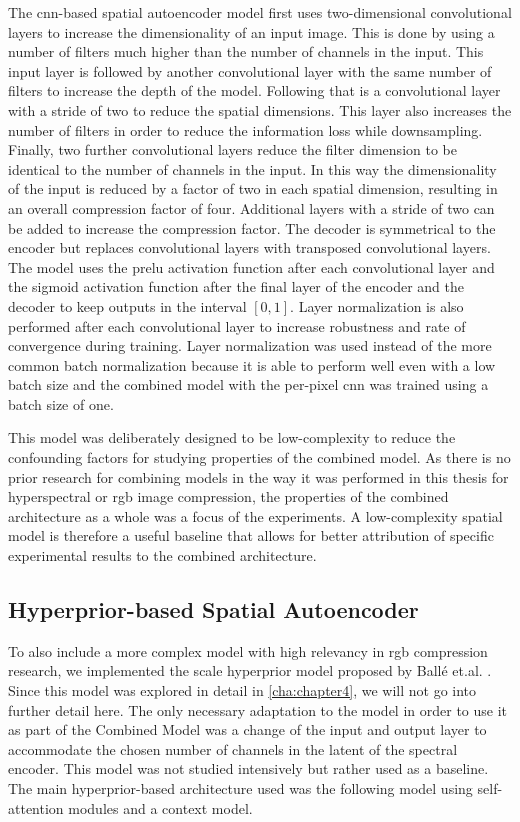 The \ac{cnn}-based spatial autoencoder model first uses two-dimensional convolutional layers to increase the dimensionality of an input image. This is done by using a number of filters much higher than the number of channels in the input. This input layer is followed by another convolutional layer with the same number of filters to increase the depth of the model. Following that is a convolutional layer with a stride of two to reduce the spatial dimensions. This layer also increases the number of filters in order to reduce the information loss while downsampling. Finally, two further convolutional layers reduce the filter dimension to be identical to the number of channels in the input. In this way the dimensionality of the input is reduced by a factor of two in each spatial dimension, resulting in an overall compression factor of four. Additional layers with a stride of two can be added to increase the compression factor. The decoder is symmetrical to the encoder but replaces convolutional layers with transposed convolutional layers. The model uses the \ac{prelu} activation function after each convolutional layer and the sigmoid activation function after the final layer of the encoder and the decoder to keep outputs in the interval $[0,1]$. Layer normalization \citep{ba_layer_2016} is also performed after each convolutional layer to increase robustness and rate of convergence during training. Layer normalization was used instead of the more common batch normalization because it is able to perform well even with a low batch size and the combined model with the per-pixel \ac{cnn} was trained using a batch size of one.

This model was deliberately designed to be low-complexity to reduce the confounding factors for studying properties of the combined model. As there is no prior research for combining models in the way it was performed in this thesis for hyperspectral or \ac{rgb} image compression, the properties of the combined architecture as a whole was a focus of the experiments. A low-complexity spatial model is therefore a useful baseline that allows for better attribution of specific experimental results to the combined architecture.
\subsection{Hyperprior-based Spatial Autoencoder}
To also include a more complex model with high relevancy in \ac{rgb} compression research, we implemented the scale hyperprior model proposed by Ballé et.al. \citep{balle_end--end_2017}. Since this model was explored in detail in \autoref{cha:chapter4}, we will not go into further detail here. The only necessary adaptation to the model in order to use it as part of the Combined Model was a change of the input and output layer to accommodate the chosen number of channels in the latent of the spectral encoder. This model was not studied intensively but rather used as a baseline. The main hyperprior-based architecture used was the following model using self-attention modules and a context model.
